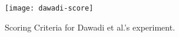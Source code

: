 \begin{figure}[ht]
    \centering
    \texttt{[image: dawadi-score]}
    \caption{Scoring Criteria for Dawadi et al.'s experiment.}
    \label{fig:dawadi-score}
\end{figure}







